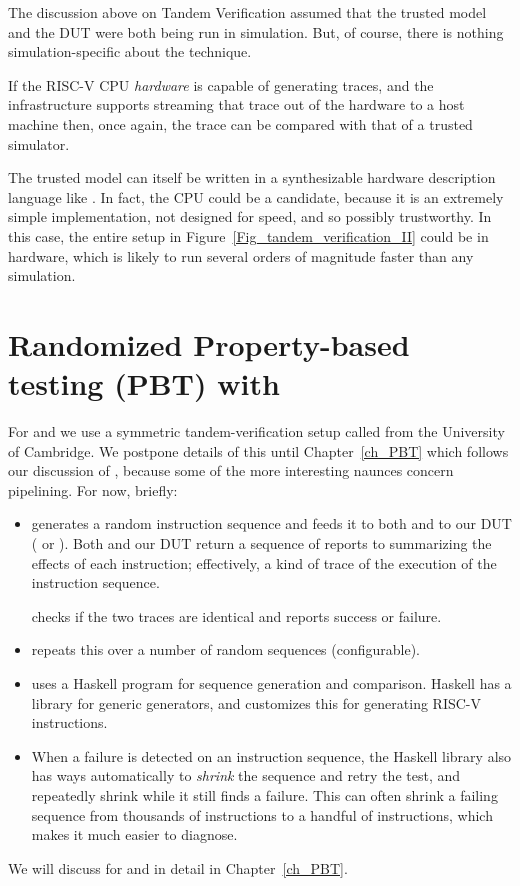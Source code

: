 The discussion above on Tandem Verification assumed that the trusted
model and the DUT were both being run in simulation.  But, of course,
there is nothing simulation-specific about the technique.

If the RISC-V CPU \emph{hardware} is capable of generating traces, and
the infrastructure supports streaming that trace out of the hardware
to a host machine then, once again, the trace can be compared with
that of a trusted simulator.

The trusted model can itself be written in a synthesizable hardware
description language like {\BSV}.  In fact, the {\DRUM} CPU could be a
candidate, because it is an extremely simple implementation, not
designed for speed, and so possibly trustworthy.  In this case, the
entire setup in Figure~\ref{Fig_tandem_verification_II} could be in
hardware, which is likely to run several orders of magnitude faster
than any simulation.


\section{Randomized Property-based testing (PBT) with {\TESTRIG}}

For {\FIFE} and {\DRUM} we use a symmetric tandem-verification setup
called {\TESTRIG} from the University of Cambridge.  We postpone
details of this until Chapter~\ref{ch_PBT} which follows our
discussion of {\FIFE}, because some of the more interesting naunces
concern pipelining.  For now, briefly:

\begin{itemize}

 \item {\TESTRIG} generates a random instruction sequence and feeds it
    to both {\SAIL} and to our DUT ({\FIFE} or {\DRUM}).  Both {\SAIL}
    and our DUT return a sequence of reports to {\TESTRIG} summarizing
    the effects of each instruction; effectively, a kind of trace of
    the execution of the instruction sequence.

    {\TESTRIG} checks if the two traces are identical and reports
    success or failure.

 \item {\TESTRIG} repeats this over a number of random sequences
    (configurable).

 \item {\TESTRIG} uses a Haskell program for sequence generation and
    comparison.  Haskell has a {\QUICKCHECK} library for generic
    generators, and {\TESTRIG} customizes this for generating RISC-V
    instructions.

 \item When a failure is detected on an instruction sequence, the
    Haskell {\QUICKCHECK} library also has ways automatically to
    \emph{shrink} the sequence and retry the test, and repeatedly
    shrink while it still finds a failure.  This can often shrink a
    failing sequence from thousands of instructions to a handful of
    instructions, which makes it much easier to diagnose.

\end{itemize}

We will discuss {\TESTRIG} for {\FIFE} and {\DRUM} in detail in
Chapter~\ref{ch_PBT}.

